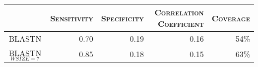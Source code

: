 \documentclass{article}
\begin{document}
\begin{center}

\noindent\begin{minipage}{\linewidth}%
\begin{center}%

\begin{tabular}{|>{\scshape}c|rrrr|}
\hline
\rowcolor[gray]{0.9}
 &\bfseries \scshape Sensitivity &\bfseries \scshape Specificity &\bfseries \scshape Correlation Coefficient &\bfseries \scshape Coverage\\
\hline
BLASTN & 0.70 & 0.19 & 0.16 & 54\%\\
BLASTN$_{WSIZE=7}$ & 0.85 & 0.18 & 0.15 & 63\%\\
\hline
\end{tabular}
\end{center}%
\end{minipage}%

\end{center}%
\end{document}
